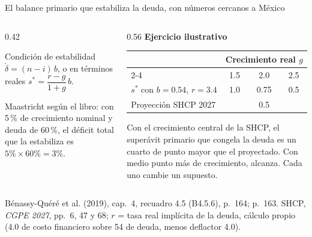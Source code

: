 \documentclass[aspectratio=169,11pt]{beamer}
\newcommand{\fuente}[1]{\par\vfill{\small\color{cGris}#1\par}}
\newcommand{\BQ}{Bénassy-Quéré et al. (2019), cap.~4}
\begin{document}
\begin{frame}{El balance primario que estabiliza la deuda, con números cercanos a México}
  \begin{columns}[T]
    \begin{column}{0.42\textwidth}
      \begin{block}{Condición de estabilidad}
        $\tilde\delta = (n - i)\,b$, o en términos reales $s^* = \dfrac{r-g}{1+g}\,b$.
      \end{block}
      \small Maastricht según el libro: con 5\,\% de crecimiento nominal y deuda de 60\,\%, el déficit total que la estabiliza es $5\% \times 60\% = 3\%$.
    \end{column}
    \begin{column}{0.56\textwidth}
      \small
      \textbf{Ejercicio ilustrativo}
      \begin{center}
      \begin{tabular}{lccc}
        \toprule
        & \multicolumn{3}{c}{Crecimiento real $g$} \\
        \cmidrule(lr){2-4}
        & 1.5 & 2.0 & 2.5 \\
        \midrule
        $s^*$ con $b = 0.54$, $r = 3.4$ & 1.0 & 0.75 & 0.5 \\
        Proyección SHCP 2027 & \multicolumn{3}{c}{0.5} \\
        \bottomrule
      \end{tabular}
      \end{center}
      \pause
      Con el crecimiento central de la SHCP, el superávit primario que congela la deuda es un cuarto de punto mayor que el proyectado. Con medio punto más de crecimiento, alcanza. Cada uno cambie un supuesto.
    \end{column}
  \end{columns}
  \fuente{\BQ, recuadro 4.5 (B4.5.6), p.~164; p.~163. SHCP, \emph{CGPE 2027}, pp.~6, 47 y 68; $r$ = tasa real implícita de la deuda, cálculo propio (4.0 de costo financiero sobre 54 de deuda, menos deflactor 4.0).}
\end{frame}
\end{document}
